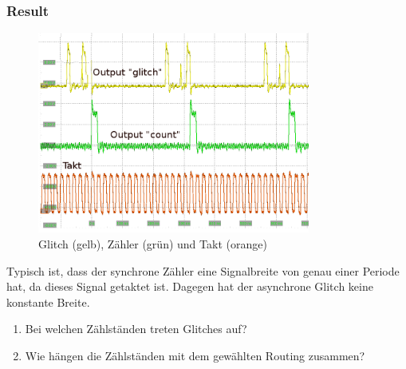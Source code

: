 \subsubsection{Result} 
\begin{figure}[H]
	\centering
	\includegraphics[width=0.8\textwidth]{images/Glitch_2_good_kommentar.png}
	\caption{Glitch (gelb), Zähler (grün) und Takt (orange)}
	\label{fig.glitch.result_1}
\end{figure}

Typisch ist, dass der synchrone Zähler eine Signalbreite von genau einer Periode hat, da dieses Signal getaktet ist. Dagegen hat der asynchrone Glitch keine konstante Breite.
\begin{enumerate}
	\item{Bei welchen Zählständen treten Glitches auf?}

	\item{Wie hängen die Zählständen mit dem gewählten Routing zusammen?}

\end{enumerate}
	
